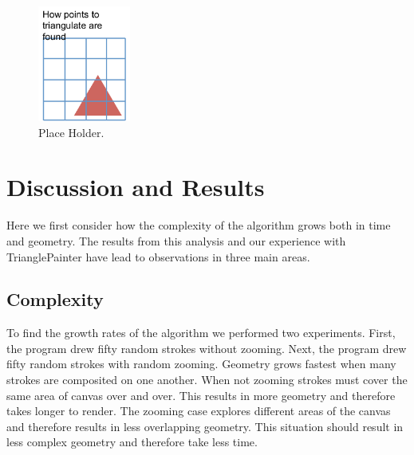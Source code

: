 \documentclass[review]{acmsiggraph}
\begin{document}
\begin{figure}
    \centering
        \includegraphics[height=1.5in]{images/findingmodifiedpoints}
    \caption{Place Holder.}
\end{figure}


\section{Discussion and Results}
Here we first consider how the complexity of the algorithm grows both in time and geometry.
The results from this analysis and our experience with TrianglePainter have lead to observations in three main areas.

\subsection{Complexity}
To find the growth rates of the algorithm we performed two experiments. 
First, the program drew fifty random strokes without zooming.
Next, the program drew fifty random strokes with random zooming.
Geometry grows fastest when many strokes are composited on one another. When not zooming strokes
must cover the same area of canvas over and over. This
results in more geometry and therefore takes longer to render. The zooming case explores different
areas of the canvas and therefore results in less overlapping geometry. This situation should result
in less complex geometry and therefore take less time.
\end{document}
